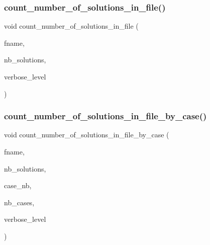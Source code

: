\subsubsection{\texorpdfstring{count\+\_\+number\+\_\+of\+\_\+solutions\+\_\+in\+\_\+file()}{count\_number\_of\_solutions\_in\_file()}}
{\footnotesize\ttfamily void count\+\_\+number\+\_\+of\+\_\+solutions\+\_\+in\+\_\+file (\begin{DoxyParamCaption}\item[{const \mbox{\hyperlink{galois_8h_ab6cc7b4aeb6ea31aba2b3fbfc83ff5e6}{B\+Y\+TE}} $\ast$}]{fname,  }\item[{\mbox{\hyperlink{galois_8h_a09fddde158a3a20bd2dcadb609de11dc}{I\+NT}} \&}]{nb\+\_\+solutions,  }\item[{\mbox{\hyperlink{galois_8h_a09fddde158a3a20bd2dcadb609de11dc}{I\+NT}}}]{verbose\+\_\+level }\end{DoxyParamCaption})}

\mbox{\label{util_8_c_a551b74b17bbcfb45bfcf847820f87304}} 
\subsubsection{\texorpdfstring{count\+\_\+number\+\_\+of\+\_\+solutions\+\_\+in\+\_\+file\+\_\+by\+\_\+case()}{count\_number\_of\_solutions\_in\_file\_by\_case()}}
{\footnotesize\ttfamily void count\+\_\+number\+\_\+of\+\_\+solutions\+\_\+in\+\_\+file\+\_\+by\+\_\+case (\begin{DoxyParamCaption}\item[{const \mbox{\hyperlink{galois_8h_ab6cc7b4aeb6ea31aba2b3fbfc83ff5e6}{B\+Y\+TE}} $\ast$}]{fname,  }\item[{\mbox{\hyperlink{galois_8h_a09fddde158a3a20bd2dcadb609de11dc}{I\+NT}} $\ast$\&}]{nb\+\_\+solutions,  }\item[{\mbox{\hyperlink{galois_8h_a09fddde158a3a20bd2dcadb609de11dc}{I\+NT}} $\ast$\&}]{case\+\_\+nb,  }\item[{\mbox{\hyperlink{galois_8h_a09fddde158a3a20bd2dcadb609de11dc}{I\+NT}} \&}]{nb\+\_\+cases,  }\item[{\mbox{\hyperlink{galois_8h_a09fddde158a3a20bd2dcadb609de11dc}{I\+NT}}}]{verbose\+\_\+level }\end{DoxyParamCaption})}

